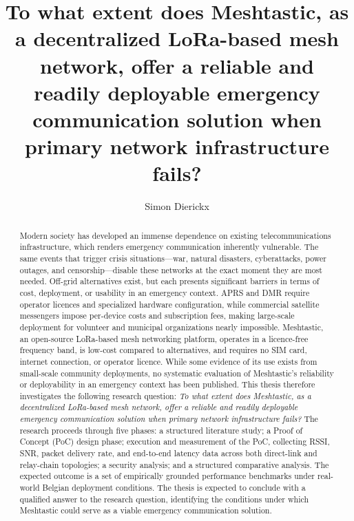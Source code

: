 \documentclass[english]{hogent-article}
\title{To what extent does Meshtastic, as a decentralized LoRa-based mesh network, offer a reliable and readily deployable emergency communication solution when primary network infrastructure fails?}
\author{Simon Dierickx}
\begin{document}
\begin{abstract}
  Modern society has developed an immense dependence on existing
  telecommunications infrastructure, which renders emergency communication
  inherently vulnerable. The same events that trigger crisis
  situations---war, natural disasters, cyberattacks, power outages, and
  censorship---disable these networks at the exact moment they are most
  needed. Off-grid alternatives exist, but each presents significant
  barriers in terms of cost, deployment, or usability in an emergency
  context. APRS and DMR require operator licences and specialized hardware
  configuration, while commercial satellite messengers impose per-device
  costs and subscription fees, making large-scale deployment for volunteer
  and municipal organizations nearly impossible. Meshtastic, an open-source
  LoRa-based mesh networking platform, operates in a licence-free frequency
  band, is low-cost compared to alternatives, and requires no SIM card,
  internet connection, or operator licence. While some evidence of its use
  exists from small-scale community deployments, no systematic evaluation of
  Meshtastic's reliability or deployability in an emergency context has been
  published. This thesis therefore investigates the following research
  question: \textit{To what extent does Meshtastic, as a decentralized
  LoRa-based mesh network, offer a reliable and readily deployable emergency
  communication solution when primary network infrastructure fails?} The
  research proceeds through five phases: a structured literature study; a
  Proof of Concept (PoC) design phase; execution and measurement of the PoC,
  collecting RSSI, SNR, packet delivery rate, and end-to-end latency data
  across both direct-link and relay-chain topologies; a security analysis;
  and a structured comparative analysis. The expected outcome is a set of
  empirically grounded performance benchmarks under real-world Belgian
  deployment conditions. The thesis is expected to conclude with a qualified
  answer to the research question, identifying the conditions under which
  Meshtastic could serve as a viable emergency communication solution.
\end{abstract}

\tableofcontents



\printbibliography[heading=bibintoc]
\end{document}
